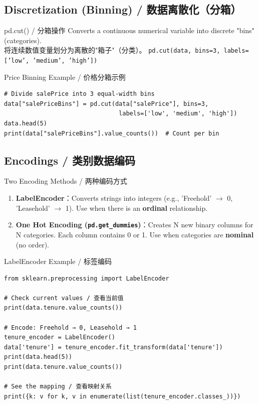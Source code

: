 \documentclass[11pt,a4paper]{report}
\let\oldtexttt\texttt
\renewcommand{\texttt}[1]{\textcolor{mainblue}{\oldtexttt{#1}}}
\begin{document}
\subsection{Discretization (Binning) / 数据离散化（分箱）}

\begin{concept}{pd.cut() / 分箱操作}
    Converts a continuous numerical variable into discrete "bins" (categories). \\
    将连续数值变量划分为离散的"箱子"（分类）。
    \texttt{pd.cut(data, bins=3, labels=['low', 'medium', 'high'])}
\end{concept}

\begin{examplebox}{Price Binning Example / 价格分箱示例}
\begin{lstlisting}
# Divide salePrice into 3 equal-width bins
data["salePriceBins"] = pd.cut(data["salePrice"], bins=3,
                                labels=['low', 'medium', 'high'])
data.head(5)
print(data["salePriceBins"].value_counts())  # Count per bin
\end{lstlisting}
\end{examplebox}

\subsection{Encodings / 类别数据编码}

\begin{concept}{Two Encoding Methods / 两种编码方式}
    \begin{enumerate}[itemsep=0.5em]
        \item \textbf{LabelEncoder}：Converts strings into integers (e.g., 'Freehold' $\rightarrow$ 0, 'Leasehold' $\rightarrow$ 1). Use when there is an \textbf{ordinal} relationship.
        \item \textbf{One Hot Encoding (\texttt{pd.get\_dummies})}：Creates N new binary columns for N categories. Each column contains 0 or 1. Use when categories are \textbf{nominal} (no order).
    \end{enumerate}
\end{concept}

\begin{examplebox}{LabelEncoder Example / 标签编码}
\begin{lstlisting}
from sklearn.preprocessing import LabelEncoder

# Check current values / 查看当前值
print(data.tenure.value_counts())

# Encode: Freehold → 0, Leasehold → 1
tenure_encoder = LabelEncoder()
data['tenure'] = tenure_encoder.fit_transform(data['tenure'])
print(data.head(5))
print(data.tenure.value_counts())

# See the mapping / 查看映射关系
print({k: v for k, v in enumerate(list(tenure_encoder.classes_))})
\end{lstlisting}
\end{examplebox}
\end{document}
